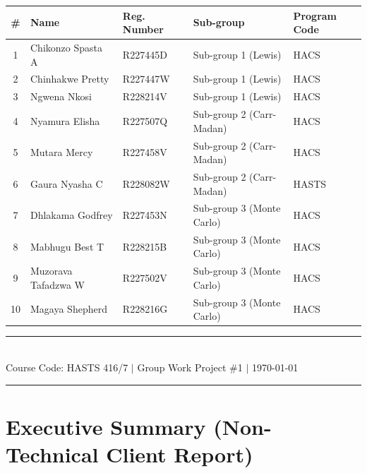 \documentclass[12pt,a4paper]{article}
\newcommand{\thead}[1]{\cellcolor{headernavy}\color{white}\textbf{#1}}
\newcommand{\rowA}{\rowcolor{white}}
\newcommand{\rowB}{\rowcolor{rowgray}}
\begin{document}
\begin{titlepage}
  \begin{tabular}{cllll}
    \hline
    \thead{\#} & \thead{Name} & \thead{Reg. Number} & \thead{Sub-group} & \thead{Program Code} \\
    \hline
    \rowA  1 & Chikonzo Spasta A   & R227445D & Sub-group 1 (Lewis)       & HACS  \\
    \rowB  2 & Chinhakwe Pretty    & R227447W & Sub-group 1 (Lewis)       & HACS  \\
    \rowA  3 & Ngwena Nkosi        & R228214V & Sub-group 1 (Lewis)       & HACS  \\
    \rowB  4 & Nyamura Elisha      & R227507Q & Sub-group 2 (Carr-Madan)  & HACS  \\
    \rowA  5 & Mutara Mercy        & R227458V & Sub-group 2 (Carr-Madan)  & HACS  \\
    \rowB  6 & Gaura Nyasha C      & R228082W & Sub-group 2 (Carr-Madan)  & HASTS \\
    \rowA  7 & Dhlakama Godfrey    & R227453N & Sub-group 3 (Monte Carlo) & HACS  \\
    \rowB  8 & Mabhugu Best T      & R228215B & Sub-group 3 (Monte Carlo) & HACS  \\
    \rowA  9 & Muzorava Tafadzwa W & R227502V & Sub-group 3 (Monte Carlo) & HACS  \\
    \rowB 10 & Magaya Shepherd     & R228216G & Sub-group 3 (Monte Carlo) & HACS  \\
    \hline
  \end{tabular}

  \vfill

  {\color{navy}\rule{\linewidth}{0.5pt}}\\[0.3cm]
  {\normalsize\color{darkgray} Course Code: HASTS 416/7 $\mid$ Group Work Project \#1 $\mid$ \today}\\
  {\color{navy}\rule{\linewidth}{2pt}}
\end{titlepage}

\newpage
\thispagestyle{fancy}
\tableofcontents
\newpage

\section{Executive Summary (Non-Technical Client Report)}
\end{document}
